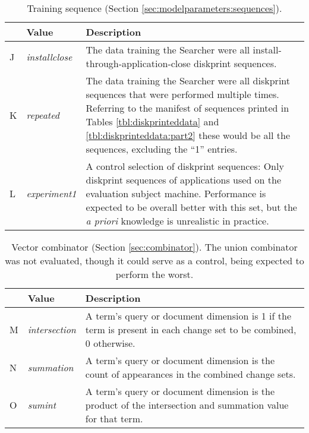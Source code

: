 \documentclass[11pt]{ucthesis}
\theoremstyle{plain}
\theoremstyle{definition}
\begin{document}
\begin{table}[htp]
\begin{small}
\caption{\label{tbl:paramenum:sequences}Training sequence (Section \ref{sec:modelparameters:sequences}).}
\begin{center}
\begin{tabular}{llp{4in}}
\toprule
 & Value & Description \\
\midrule
J & \emph{installclose} & The data training the Searcher were all install-through-application-close diskprint sequences. \\
K & \emph{repeated} & The data training the Searcher were all diskprint sequences that were performed multiple times. Referring to the manifest of sequences printed in Tables \ref{tbl:diskprinteddata} and \ref{tbl:diskprinteddata:part2} these would be all the sequences, excluding the ``1'' entries. \\
L & \emph{experiment1} & A control selection of diskprint sequences:  Only diskprint sequences of applications used on the evaluation subject machine. Performance is expected to be overall better with this set, but the \emph{a priori} knowledge is unrealistic in practice. \\
\bottomrule
\end{tabular}
\end{center}
\end{small}
\end{table}

\begin{table}[htp]
\begin{small}
\caption{\label{tbl:paramenum:combinator}Vector combinator (Section \ref{sec:combinator}).  The union combinator was not evaluated, though it could serve as a control, being expected to perform the worst.}
\begin{center}
\begin{tabular}{llp{4in}}
\toprule
 & Value & Description \\
\midrule
M & \emph{intersection} & A term's query or document dimension is 1 if the term is present in each change set to be combined, 0 otherwise. \\
N & \emph{summation} & A term's query or document dimension is the count of appearances in the combined change sets. \\
O & \emph{sumint} & A term's query or document dimension is the product of the intersection and summation value for that term. \\
\bottomrule
\end{tabular}
\end{center}
\end{small}
\end{table}
\end{document}
